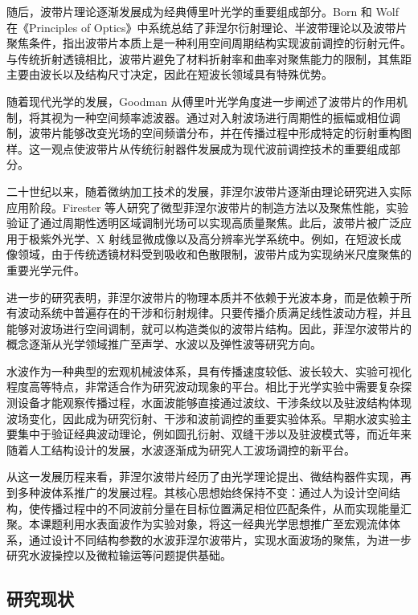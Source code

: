 \documentclass[11pt,a4paper]{ctexart}
\begin{document}
随后，波带片理论逐渐发展成为经典傅里叶光学的重要组成部分。Born 和 Wolf 在《Principles of Optics》中系统总结了菲涅尔衍射理论、半波带理论以及波带片聚焦条件，指出波带片本质上是一种利用空间周期结构实现波前调控的衍射元件\cite{BornWolf1999}。与传统折射透镜相比，波带片避免了材料折射率和曲率对聚焦能力的限制，其焦距主要由波长以及结构尺寸决定，因此在短波长领域具有特殊优势。

随着现代光学的发展，Goodman 从傅里叶光学角度进一步阐述了波带片的作用机制，将其视为一种空间频率滤波器。通过对入射波场进行周期性的振幅或相位调制，波带片能够改变光场的空间频谱分布，并在传播过程中形成特定的衍射重构图样\cite{Goodman2005}。这一观点使波带片从传统衍射器件发展成为现代波前调控技术的重要组成部分。

二十世纪以来，随着微纳加工技术的发展，菲涅尔波带片逐渐由理论研究进入实际应用阶段。Firester 等人研究了微型菲涅尔波带片的制造方法以及聚焦性能，实验验证了通过周期性透明区域调制光场可以实现高质量聚焦\cite{Firester1973}。此后，波带片被广泛应用于极紫外光学、X 射线显微成像以及高分辨率光学系统中。例如，在短波长成像领域，由于传统透镜材料受到吸收和色散限制，波带片成为实现纳米尺度聚焦的重要光学元件\cite{Boivin1977}。

进一步的研究表明，菲涅尔波带片的物理本质并不依赖于光波本身，而是依赖于所有波动系统中普遍存在的干涉和衍射规律。只要传播介质满足线性波动方程，并且能够对波场进行空间调制，就可以构造类似的波带片结构。因此，菲涅尔波带片的概念逐渐从光学领域推广至声学、水波以及弹性波等研究方向。

水波作为一种典型的宏观机械波体系，具有传播速度较低、波长较大、实验可视化程度高等特点，非常适合作为研究波动现象的平台。相比于光学实验中需要复杂探测设备才能观察传播过程，水面波能够直接通过波纹、干涉条纹以及驻波结构体现波场变化，因此成为研究衍射、干涉和波前调控的重要实验体系。早期水波实验主要集中于验证经典波动理论，例如圆孔衍射、双缝干涉以及驻波模式等，而近年来随着人工结构设计的发展，水波逐渐成为研究人工波场调控的新平台。

从这一发展历程来看，菲涅尔波带片经历了由光学理论提出、微结构器件实现，再到多种波体系推广的发展过程。其核心思想始终保持不变：通过人为设计空间结构，使传播过程中的不同波前分量在目标位置满足相位匹配条件，从而实现能量汇聚。本课题利用水表面波作为实验对象，将这一经典光学思想推广至宏观流体体系，通过设计不同结构参数的水波菲涅尔波带片，实现水面波场的聚焦，为进一步研究水波操控以及微粒输运等问题提供基础。

\subsection{研究现状}
\end{document}
